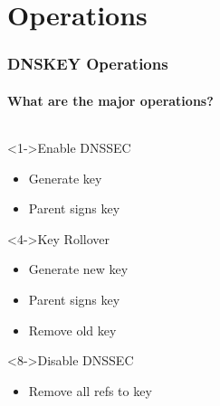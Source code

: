 \documentclass{beamer}
\begin{document}
\section{Operations}

\begin{frame}
  \frametitle{DNSKEY Operations}
  \framesubtitle{What are the major operations?}

  \begin{columns}[c]
    \begin{column}{4.8cm}
      \begin{block}<1->{Enable DNSSEC}
        \begin{itemize}
        \item Generate key
        \item Parent signs key
        \end{itemize}
      \end{block}

      \begin{block}<4->{Key Rollover}
        \begin{itemize}
        \item Generate new key
        \item Parent signs key
        \item Remove old key
        \end{itemize}
      \end{block}

      \begin{block}<8->{Disable DNSSEC}
        \begin{itemize}
        \item Remove \alert{all} refs to key
        \end{itemize}
      \end{block}

    \end{column}


  \end{columns}

\end{frame}
\end{document}
